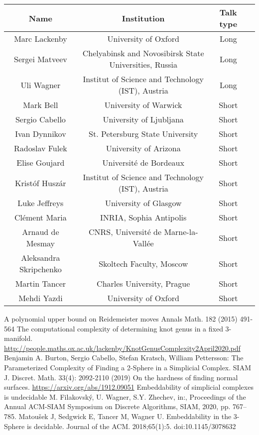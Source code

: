\documentclass[12pt,fleqn]{article}
\begin{document}
\begin{center}
\begin{tabular}[h]{|c|c|c|l|}
  \hline
 Name & Institution & Talk type \\
\hline \hline
Marc Lackenby & University of Oxford & Long \\
  \hline
Sergei  Matveev & Chelyabinsk and  Novosibirsk State Universities, Russia& Long \\
  \hline
Uli Wagner & Institut of Science and Technology (IST), Austria & Long \\
  \hline
  \hline
 Mark Bell &  University of Warwick & Short \\
  \hline
 Sergio Cabello &  University of Ljubljana & Short \\
  \hline
 Ivan Dynnikov &  St. Petersburg State University & Short \\
  \hline
 Radoslav  Fulek &  University of Arizona & Short \\
  \hline
 Elise Goujard &  Université de Bordeaux & Short \\
  \hline
 Kristóf Huszár &  Institut of Science and Technology (IST), Austria & Short \\
  \hline
 Luke Jeffreys &  University of Glasgow & Short \\
  \hline
 Clément Maria &  INRIA, Sophia Antipolis & Short \\
  \hline
 Arnaud de Mesmay & CNRS, Université de Marne-la-Vallée & Short \\
  \hline
 Aleksandra Skripchenko &  Skoltech Faculty, Moscow & Short \\
  \hline
 Martin Tancer &  Charles University, Prague & Short \\
  \hline
 Mehdi Yazdi &  University of Oxford & Short \\
  \hline
\end{tabular}
\end{center}


\begin{thebibliography}{1}

A polynomial upper bound on Reidemeister moves Annals Math. 182 (2015) 491-564
The computational complexity of determining knot genus in a fixed 3-manifold.
\url{ http://people.maths.ox.ac.uk/lackenby/KnotGenusComplexity2April2020.pdf}
Benjamin A. Burton, Sergio Cabello, Stefan Kratsch, William Pettersson:
The Parameterized Complexity of Finding a 2-Sphere in a Simplicial Complex. SIAM J. Discret. Math. 33(4): 2092-2110 (2019)
On the hardness of finding normal surfaces. \url{https://arxiv.org/abs/1912.09051}
Embeddability of simplicial complexes is undecidable
M. Filakovský, U. Wagner, S.Y. Zhechev, in:, Proceedings of the Annual ACM-SIAM Symposium on Discrete Algorithms, SIAM, 2020, pp. 767–785. 
Matoušek J, Sedgwick E, Tancer M, Wagner U. Embeddability in the 3-Sphere is decidable. Journal of the ACM. 2018;65(1):5. doi:10.1145/3078632

\end{thebibliography}
\end{document}

